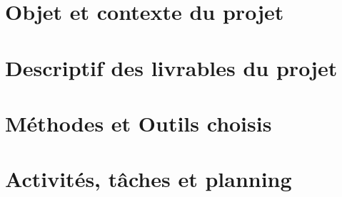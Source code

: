

\newcommand{\mainTitle}{\'Etude préalable - SPIE}
\newcommand{\secondTitle}{Dossier d'Initialisation}
\newcommand{\documentRef}{DI/4401/1}




\listoftodos
\newpage
{}
\tableofcontents
{}
\listoffigures
{}
\listoftables
\newpage


\part{Objet et contexte du projet}
\setcounter{section}{0}

\part{Descriptif des livrables du projet}
\setcounter{section}{0}

\part{Méthodes et Outils choisis}
\setcounter{section}{0}

\part{Activités, tâches et planning}
\setcounter{section}{0}

